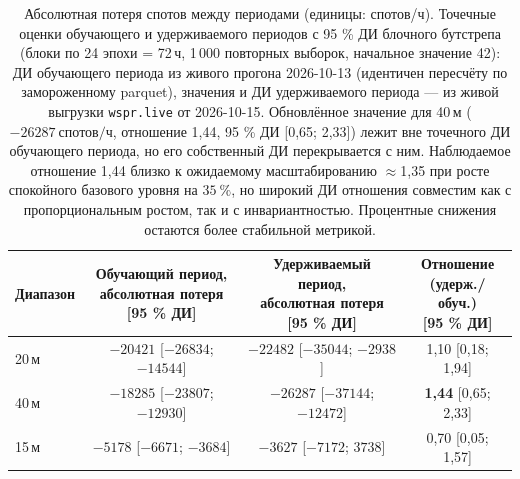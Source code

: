 \documentclass{agujournal2019}
\begin{document}
\begin{table}[h]
	\centering
	\footnotesize
	\setlength{\tabcolsep}{3pt}
	\caption{Абсолютная потеря спотов между периодами (единицы: спотов/ч).
		Точечные оценки обучающего и удерживаемого периодов с 95 \%
		ДИ блочного бутстрепа (блоки по 24 эпохи = 72\,ч, 1\,000 повторных выборок,
		начальное значение 42): ДИ обучающего периода из живого прогона 2026-10-13 (идентичен
		пересчёту по замороженному parquet), значения и ДИ удерживаемого
		периода — из живой выгрузки \texttt{wspr.live} от 2026-10-15.
		Обновлённое значение для 40\,м ($\SI{-26287}{\mbox{спотов/ч}}$, отношение
		1,44, 95 \% ДИ [0,65; 2,33]) лежит вне точечного ДИ обучающего периода,
		но его собственный ДИ перекрывается с ним. Наблюдаемое отношение 1,44 близко к ожидаемому масштабированию $\approx$1,35 при росте спокойного
		базового уровня на $\SI{+35}{\percent}$, но широкий ДИ отношения
		совместим как с пропорциональным ростом, так и с инвариантностью.
		Процентные снижения остаются более стабильной метрикой.\protect\footnotemark{}}
	\label{tab:baseline}
	\begin{tabular}{lccc}
		\toprule
		Диапазон
		& \shortstack[b]{Обучающий период,\\ абсолютная потеря\\ {}[95 \% ДИ]}
		& \shortstack[b]{Удерживаемый период,\\ абсолютная потеря\\ {}[95 \% ДИ]}
		& \shortstack[b]{Отношение\\ (удерж./обуч.)\\ {}[95 \% ДИ]} \\
		\midrule
		20\,м & $\num{-20421}$ [$\num{-26834}$; $\num{-14544}$]
		& $\num{-22482}$ [$\num{-35044}$; $\num{-2938}$]
		& 1,10 [0,18; 1,94] \\
		40\,м & $\num{-18285}$ [$\num{-23807}$; $\num{-12930}$]
		& $\num{-26287}$ [$\num{-37144}$; $\num{-12472}$]
		& \textbf{1,44} [0,65; 2,33] \\
		15\,м & $\num{-5178}$ [$\num{-6671}$; $\num{-3684}$]
		& $\num{-3627}$ [$\num{-7172}$; $\num{3738}$]
		& 0,70 [0,05; 1,57] \\
		\bottomrule
	\end{tabular}
\end{table}
\end{document}
